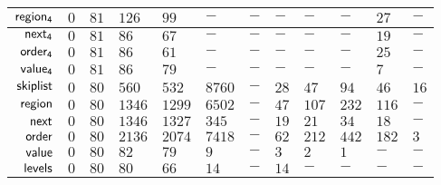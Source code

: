 {\begin{tabular}{ |r||T|T|T||T|T|T|T|T|T|T|T||}
		$\mathsf{region_{4}}$	  & $0$ & $81$ &$126$ & $99$ &  $-$ & $-$ &  $-$ &  $-$  &  $-$  &$27$ & $-$ \\ \hline
		$\mathsf{next_{4}}$		  & $0$ & $81$ &$ 86$ & $67$ &  $-$ & $-$ &  $-$ &  $-$  &  $-$  &$19$ & $-$ \\ \hline
		$\mathsf{order_{4}}$		  & $0$ & $81$ &$ 86$ & $61$ &  $-$ & $-$ &  $-$ &  $-$  &  $-$  &$25$ & $-$ \\ \hline
		$\mathsf{value_{4}}$		  & $0$ & $81$ &$ 86$ & $79$ &  $-$ & $-$ &  $-$ &  $-$  &  $-$  & $7$ & $-$ \\ \hline \hline





		$\mathsf{skiplist}$			& $0$ & $80$ &$560$ &$532$ &$8760$& $-$ & $28$ & $47$  &  $94$ &$46$ &$16$ \\ \hline
		$\mathsf{region}$			& $0$ & $80$ &$1346$&$1299$&$6502$& $-$ & $47$ & $107$ & $232$ &$116$& $-$ \\ \hline
		$\mathsf{next}$				& $0$ & $80$ &$1346$&$1327$& $345$& $-$ & $19$ &  $21$ &  $34$ & $18$& $-$ \\ \hline
		$\mathsf{order}$				& $0$ & $80$ &$2136$&$2074$&$7418$& $-$ & $62$ & $212$ & $442$ &$182$& $3$ \\ \hline
		$\mathsf{value}$				& $0$ & $80$ & $82$ & $79$ &  $9$ & $-$ &  $3$ &   $2$ &   $1$ & $-$ & $-$ \\ \hline
		$\mathsf{levels}$			& $0$ & $80$ & $80$ & $66$ & $14$ & $-$ & $14$ &   $-$ &   $-$ & $-$ & $-$ \\ \hline
	\end{tabular}
}


